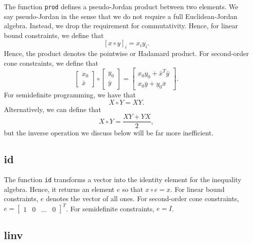 \documentclass{report}
\begin{document}
        The function \texttt{prod} defines a pseudo-Jordan product between two elements.  We say pseudo-Jordan in the sense that we do not require a full Euclidean-Jordan algebra.  Instead, we drop the requirement for commutativity.  Hence, for linear bound constraints, we define that
$$
        [x\circ y]_i = x_iy_i.
$$
Hence, the product denotes the pointwise or Hadamard product.  For second-order cone constraints, we define that
$$
        \begin{bmatrix}x_0\\\bar{x}\end{bmatrix} \circ \begin{bmatrix}y_0\\\bar{y}\end{bmatrix}=\begin{bmatrix} x_0y_0 + \bar{x}^T\bar{y}\\x_0 \bar{y} + y_0 \bar{x}\end{bmatrix}.
$$
For semidefinite programming, we have that
$$
        X\circ Y = XY.
$$
Alternatively, we can define that
$$
        X\circ Y = \frac{XY + YX}{2},
$$
but the inverse operation we discuss below will be far more inefficient.

\subsection{id} 

       The function \texttt{id} transforms a vector into the identity element for the inequality algebra.  Hence, it returns an element $e$ so that $x\circ e=x$.   For linear bound constraints, $e$ denotes the vector of all ones.  For second-order cone constraints, $e=\begin{bmatrix} 1 & 0 & \dots & 0\end{bmatrix}^T$.  For semidefinite constraints, $e=I$.

\subsection{linv}
\end{document}
